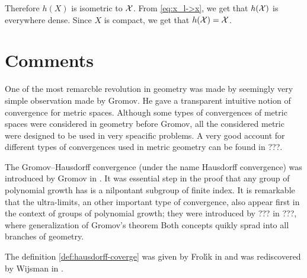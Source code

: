 Therefore $h(X)$ is isometric to $\mathcal{X}$.
From \ref{eq:x_l->x}, we get that $h(\mathcal{X})$ is everywhere dense.
Since $X$ is compact, we get that $h(\mathcal{X})=\mathcal{X}$.
%
\qeds

\section{Comments}

One of the most remarcble revolution in geometry was made by seemingly very simple observation made by Gromov.
He gave a transparent intuitive notion of convergence for metric spaces.
Although some types of convergences of metric spaces
were considered in geometry before Gromov,
all the considered metric were designed to be used in very speacific problems.
A very good account for different types of convergences used in metric geometry can be found in ???.

The Gromov--Hausdorff convergence (under the name Hausdorff convergence)
was introduced by Gromov in \cite{gromov-polynomial-growth}.
It was essential step in the proof that any group of polynomial growth has is a nilpontant subgroup of finite index.
It is remarkable that the ultra-limits,
an other important type of convergence,
also appear first in the context of  groups of polynomial growth;
they were introduced by ??? in ???, where generalization of Gromov's theorem
Both concepts quikly sprad into all branches of geometry.


The definition \ref{def:hausdorff-coverge} was given by Frol\'{\i}k in \cite{frolik} %
and was rediscovered by Wijsman in \cite{wijsman}.

